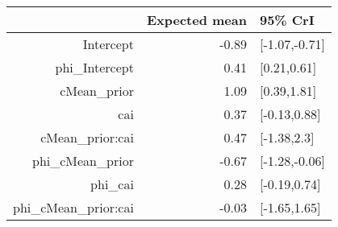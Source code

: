 \begin{tabular}{rrl}
  \hline
 & Expected mean & 95\% CrI \\ 
  \hline
Intercept & -0.89 & [-1.07,-0.71] \\ 
  phi\_Intercept & 0.41 & [0.21,0.61] \\ 
  cMean\_prior & 1.09 & [0.39,1.81] \\ 
  cai & 0.37 & [-0.13,0.88] \\ 
  cMean\_prior:cai & 0.47 & [-1.38,2.3] \\ 
  phi\_cMean\_prior & -0.67 & [-1.28,-0.06] \\ 
  phi\_cai & 0.28 & [-0.19,0.74] \\ 
  phi\_cMean\_prior:cai & -0.03 & [-1.65,1.65] \\ 
   \hline
\end{tabular}

